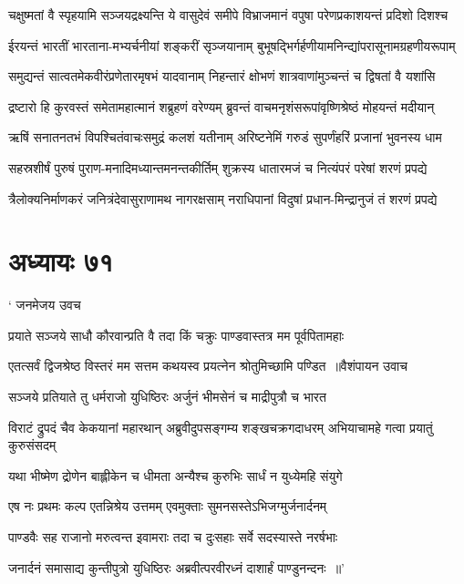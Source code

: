 \twolineshloka
{चक्षुष्मतां वै स्पृहयामि सञ्जयद्रक्ष्यन्ति ये वासुदेवं समीपे}
{विभ्राजमानं वपुषा परेणप्रकाशयन्तं प्रदिशो दिशश्च}


\twolineshloka
{ईरयन्तं भारतीं भारताना-मभ्यर्चनीयां शङ्करीं सृञ्जयानाम्}
{बुभूषद्भिर्गर्हणीयामनिन्द्यांपरासूनामग्रहणीयरूपाम्}


\twolineshloka
{समुद्यन्तं सात्वतमेकवीरंप्रणेतारमृषभं यादवानाम्}
{निहन्तारं क्षोभणं शात्रवाणांमुञ्चन्तं च द्विषतां वै यशांसि}


\twolineshloka
{द्रष्टारो हि कुरवस्तं समेतामहात्मानं शब्रुहणं वरेण्यम्}
{ब्रुवन्तं वाचमनृशंसरूपांवृष्णिश्रेष्ठं मोहयन्तं मदीयान्}


\twolineshloka
{ऋषिं सनातनतभं विपश्चितंवाचःसमुद्रं कलशं यतीनाम्}
{अरिष्टनेमिं गरुडं सुपर्णंहरिं प्रजानां भुवनस्य धाम}


\twolineshloka
{सहस्रशीर्षं पुरुषं पुराण-मनादिमध्यान्तमनन्तकीर्तिम्}
{शुक्रस्य धातारमजं च नित्यंपरं परेषां शरणं प्रपद्ये}


\twolineshloka
{त्रैलोक्यनिर्माणकरं जनित्रंदेवासुराणामथ नागरक्षसाम्}
{नराधिपानां विदुषां प्रधान-मिन्द्रानुजं तं शरणं प्रपद्ये}


\chapter{अध्यायः ७१}
\twolineshloka
{` जनमेजय उवच}
{}


\twolineshloka
{प्रयाते सञ्जये साधौ कौरवान्प्रति वै तदा}
{किं चक्रुः पाण्डवास्तत्र मम पूर्वपितामहाः}


\threelineshloka
{एतत्सर्वं द्विजश्रेष्ठ विस्तरं मम सत्तम}
{कथयस्व प्रयत्नेन श्रोतुमिच्छामि पण्डित ॥वैशंपायन उवाच}
{}


\twolineshloka
{सञ्जये प्रतियाते तु धर्मराजो युधिष्ठिरः}
{अर्जुनं भीमसेनं च माद्रीपुत्रौ च भारत}


\threelineshloka
{विराटं द्रुपदं चैव केकयानां महारथान्}
{अब्रुवीदुपसङ्गम्य शङ्खचक्रगदाधरम्}
{अभियाचामहे गत्वा प्रयातुं कुरुसंसदम्}


\twolineshloka
{यथा भीष्मेण द्रोणेन बाह्लीकेन च धीमता}
{अन्यैश्च कुरुभिः सार्धं न युध्येमहि संयुगे}


\twolineshloka
{एष नः प्रथमः कल्प एतन्निश्रेय उत्तमम्}
{एवमुक्ताः सुमनसस्तेऽभिजग्मुर्जनार्दनम्}


\twolineshloka
{पाण्डवैः सह राजानो मरुत्वन्त इवामराः}
{तदा च दुःसहाः सर्वे सदस्यास्ते नरर्षभाः}


\twolineshloka
{जनार्दनं समासाद्य कुन्तीपुत्रो युधिष्ठिरः}
{अब्रवीत्परवीरध्नं दाशार्हं पाण्डुनन्दनः ॥'}


